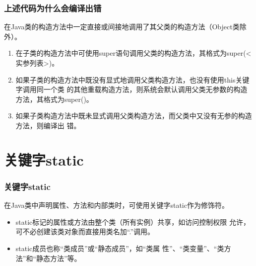 \begin{frame}[fragile] %
  \frametitle{上述代码为什么会编译出错}

  {\Blue\hei 在Java类的构造方法中一定直接或间接地调用了其父类的构造方法（Object类除外）。}

  \begin{enumerate}[<+-| structure@+>]
  \item 在子类的构造方法中可使用super语句调用父类的构造方法，其格式为super(<实参列表>)。
  \item 如果子类的构造方法中既没有显式地调用父类构造方法，也没有使用this关键字调用同一个类
    的其他重载构造方法，则系统会默认调用父类无参数的构造方法，其格式为super()。
  \item 如果子类构造方法中既未显式调用父类构造方法，而父类中又没有无参的构造方法，则编译出
    错。
  \end{enumerate}

  
\end{frame}


\section{关键字static}

\begin{frame}[fragile] %
  \frametitle{关键字static}

  在Java类中声明{\hei\Red 属性、方法和内部类}时，可使用关键字static作为修饰符。

  \begin{itemize}[<+-| structure@+>]
  \item static标记的属性或方法由整个类（所有实例）共享，如访问控制权限
    允许，可不必创建该类对象而直接用类名加“.”调用。
  \item static成员也称{\hei\Blue “类成员”或“静态成员”}，如“类属
    性”、“类变量”、“类方法”和“静态方法”等。
  \end{itemize}
\end{frame}


